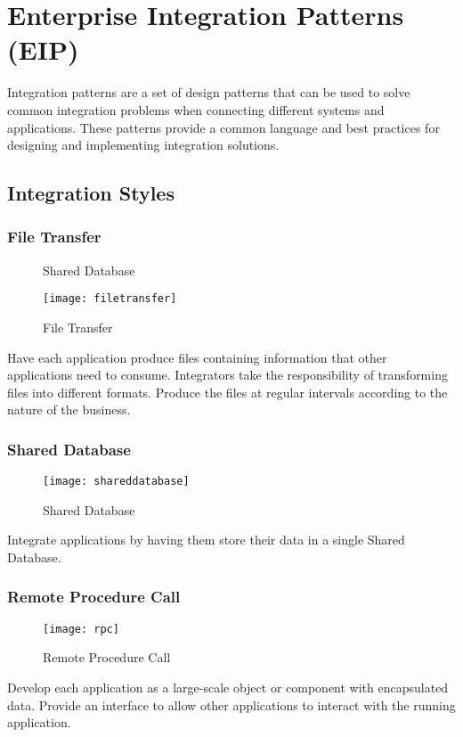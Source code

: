 \section{Enterprise Integration Patterns (EIP)}
Integration patterns are a set of design patterns that can be used to solve common integration problems when connecting different systems and applications. These patterns provide a common language and best practices for designing and implementing integration solutions.

\subsection{Integration Styles}
\subsubsection{File Transfer}
\begin{minipage}{.4\textwidth}
  \begin{figure}[H]
  \center
  \caption{Shared Database}
  \texttt{[image: filetransfer]}
  \caption{File Transfer}
\end{figure}
\end{minipage}
\begin{minipage}[b]{.6\textwidth}
  Have each application produce files containing information that other applications need to consume. Integrators take the responsibility of transforming files into different formats. Produce the files at regular intervals according to the nature of the business.
\end{minipage}

\subsubsection{Shared Database}
\begin{minipage}{.4\textwidth}
  \begin{figure}[H]
  \center
  \texttt{[image: shareddatabase]}
  \caption{Shared Database}
\end{figure}
\end{minipage}
\begin{minipage}[b]{.6\textwidth}
  Integrate applications by having them store their data in a single Shared Database.
\end{minipage}

\subsubsection{Remote Procedure Call}
\begin{minipage}{.4\textwidth}
\begin{figure}[H]
  \center
  \texttt{[image: rpc]}
  \caption{Remote Procedure Call}
\end{figure}
\end{minipage}
\begin{minipage}[b]{.6\textwidth}
Develop each application as a large-scale object or component with encapsulated data. Provide an interface to allow other applications to interact with the running application.
\end{minipage}

